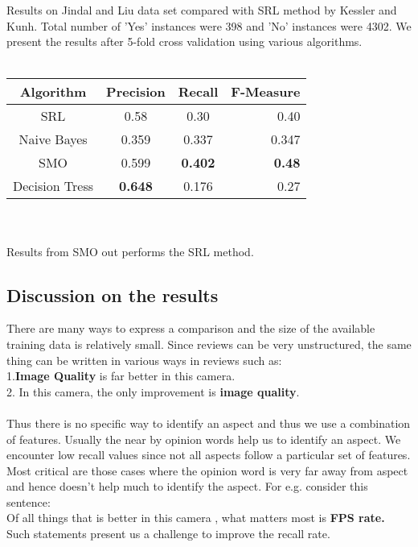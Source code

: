 \documentclass[12pt]{article}
\begin{document}
\noindent
Results on Jindal and Liu data set compared with SRL method by Kessler and Kunh. Total number of 'Yes' instances were 398 and 'No' instances were 4302. We present the results after 5-fold cross validation using various algorithms. \\\\
\begin{tabular}{ | c || c | c | r |  }
\hline			
  Algorithm  & Precision & Recall & F-Measure \\ \hline
  SRL & 0.58 & 0.30 & 0.40 \\ \hline
  Naive Bayes & 0.359 & 0.337 & 0.347 \\ \hline
  SMO & 0.599 & \textbf{0.402} & \textbf{0.48} \\ \hline
  Decision Tress & \textbf{0.648} & 0.176 & 0.27 \\ \hline
\end{tabular} \\\\

\noindent
Results from SMO out performs the SRL method.

\subsection{Discussion on the results}
There are many ways to express a comparison and the size of the available training
data is relatively small. Since reviews can be very unstructured, the same thing can be written in various ways in reviews such as:\\
1.\textbf{Image Quality} is far better in this camera. \\
2. In this camera, the only improvement is \textbf {image quality}. \\\\
Thus there is no specific way to identify an aspect and thus we use a combination of features. Usually the near by opinion words help us to identify an aspect.
We encounter low recall values since not all aspects follow a particular set of features. Most critical are those cases where the opinion word is very far away from aspect and hence doesn't help much to identify the aspect. For e.g. consider this sentence: \\
Of all things that is better in this camera , what matters  most is \textbf{FPS rate.}\\
Such statements present us a challenge to improve the recall rate.
\end{document}
